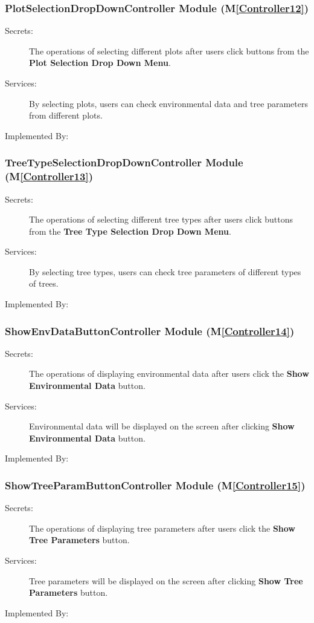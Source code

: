 \documentclass[12pt, titlepage]{article}
\newcommand{\mref}[1]{M\ref{#1}}
\begin{document}
\renewcommand{\bt}{\textbf{Plot Selection Drop Down Menu}}
\subsubsection{PlotSelectionDropDownController Module (\mref{Controller12})}
\begin{description}
\item[Secrets:] The operations of selecting different plots after users click buttons 
from the \bt.
\item[Services:] By selecting plots, users can check environmental data and tree parameters
from different plots.
\item[Implemented By:] \progname{}
\end{description}

\renewcommand{\bt}{\textbf{Tree Type Selection Drop Down Menu}}
\subsubsection{TreeTypeSelectionDropDownController Module (\mref{Controller13})}
\begin{description}
\item[Secrets:] The operations of selecting different tree types after users click buttons 
from the \bt.
\item[Services:] By selecting tree types, users can check tree parameters of different 
types of trees.
\item[Implemented By:] \progname{}
\end{description}

\renewcommand{\bt}{\textbf{Show Environmental Data }}
\subsubsection{ShowEnvDataButtonController Module (\mref{Controller14})}
\begin{description}
\item[Secrets:] The operations of displaying environmental data
 after users click the \bt button.
\item[Services:] Environmental data will be displayed on the screen after clicking \bt button.
\item[Implemented By:] \progname{}
\end{description}

\renewcommand{\bt}{\textbf{Show Tree Parameters }}
\subsubsection{ShowTreeParamButtonController Module (\mref{Controller15})}
\begin{description}
\item[Secrets:] The operations of displaying tree parameters after users click the \bt button.
\item[Services:] Tree parameters will be displayed on the screen after clicking \bt button.
\item[Implemented By:] \progname{}
\end{description}
\end{document}
